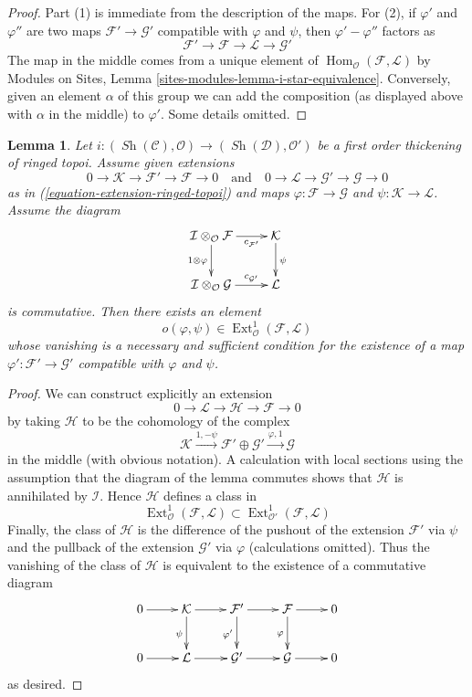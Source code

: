 \documentclass{stacks-project}
\theoremstyle{plain}
\newtheorem{lemma}[subsection]{Lemma}
\theoremstyle{definition}
\theoremstyle{remark}
\numberwithin{equation}{subsection}
\def\Hom{\mathop{\mathrm{Hom}}\nolimits}
\def\Ext{\mathop{\mathrm{Ext}}\nolimits}
\def\Sh{\mathop{\mathit{Sh}}\nolimits}
\begin{document}
\begin{proof}
Part (1) is immediate from the description of the maps.
For (2), if $\varphi'$ and $\varphi''$ are two maps
$\mathcal{F}' \to \mathcal{G}'$ compatible with $\varphi$
and $\psi$, then $\varphi' - \varphi''$ factors as
$$
\mathcal{F}' \to \mathcal{F} \to \mathcal{L} \to \mathcal{G}'
$$
The map in the middle comes from a unique element of
$\Hom_\mathcal{O}(\mathcal{F}, \mathcal{L})$ by
Modules on Sites, Lemma \ref{sites-modules-lemma-i-star-equivalence}.
Conversely, given an element $\alpha$ of this group we can add the
composition (as displayed above with $\alpha$ in the middle)
to $\varphi'$. Some details omitted.
\end{proof}

\begin{lemma}
\label{lemma-inf-obs-map-ringed-topoi}
Let $i : (\Sh(\mathcal{C}), \mathcal{O}) \to (\Sh(\mathcal{D}), \mathcal{O}')$
be a first order thickening of ringed topoi. Assume given extensions
$$
0 \to \mathcal{K} \to \mathcal{F}' \to \mathcal{F} \to 0
\quad\text{and}\quad
0 \to \mathcal{L} \to \mathcal{G}' \to \mathcal{G} \to 0
$$
as in (\ref{equation-extension-ringed-topoi})
and maps $\varphi : \mathcal{F} \to \mathcal{G}$ and
$\psi : \mathcal{K} \to \mathcal{L}$. Assume the diagram
$$
\xymatrix{
\mathcal{I} \otimes_\mathcal{O} \mathcal{F}
\ar[r]_-{c_{\mathcal{F}'}} \ar[d]_{1 \otimes \varphi} &
\mathcal{K} \ar[d]^\psi \\
\mathcal{I} \otimes_\mathcal{O} \mathcal{G}
\ar[r]^-{c_{\mathcal{G}'}} &
\mathcal{L}
}
$$
is commutative. Then there exists an element
$$
o(\varphi, \psi) \in
\Ext^1_\mathcal{O}(\mathcal{F}, \mathcal{L})
$$
whose vanishing is a necessary and sufficient condition for the existence
of a map $\varphi' : \mathcal{F}' \to \mathcal{G}'$ compatible with
$\varphi$ and $\psi$.
\end{lemma}

\begin{proof}
We can construct explicitly an extension
$$
0 \to \mathcal{L} \to \mathcal{H} \to \mathcal{F} \to 0
$$
by taking $\mathcal{H}$ to be the cohomology of the complex
$$
\mathcal{K}
\xrightarrow{1, - \psi}
\mathcal{F}' \oplus \mathcal{G}' \xrightarrow{\varphi, 1}
\mathcal{G}
$$
in the middle (with obvious notation). A calculation with local sections
using the assumption that the diagram of the lemma commutes
shows that $\mathcal{H}$ is annihilated by $\mathcal{I}$. Hence
$\mathcal{H}$ defines a class in
$$
\Ext^1_\mathcal{O}(\mathcal{F}, \mathcal{L})
\subset
\Ext^1_{\mathcal{O}'}(\mathcal{F}, \mathcal{L})
$$
Finally, the class of $\mathcal{H}$ is the difference of the pushout
of the extension $\mathcal{F}'$ via $\psi$ and the pullback
of the extension $\mathcal{G}'$ via $\varphi$ (calculations omitted).
Thus the vanishing of the class of $\mathcal{H}$ is equivalent to the
existence of a commutative diagram
$$
\xymatrix{
0 \ar[r] &
\mathcal{K} \ar[r] \ar[d]_{\psi} &
\mathcal{F}' \ar[r] \ar[d]_{\varphi'} &
\mathcal{F} \ar[r] \ar[d]_\varphi & 0\\
0 \ar[r] &
\mathcal{L} \ar[r] &
\mathcal{G}' \ar[r] &
\mathcal{G} \ar[r] & 0
}
$$
as desired.
\end{proof}
\end{document}
